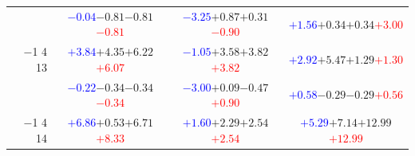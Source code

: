 \documentclass[compress]{beamer}
\begin{document}
\begin{frame}
\begin{tabular}{r | c | c | c}
          & \textcolor{blue}{$-0.04$}\hspace{0.1 cm}$-0.81$\hspace{0.1 cm}$-0.81$\hspace{0.1 cm}\textcolor{red}{$-0.81$} & \textcolor{blue}{$-3.25$}\hspace{0.1 cm}$+0.87$\hspace{0.1 cm}$+0.31$\hspace{0.1 cm}\textcolor{red}{$-0.90$} & \textcolor{blue}{$+1.56$}\hspace{0.1 cm}$+0.34$\hspace{0.1 cm}$+0.34$\hspace{0.1 cm}\textcolor{red}{$+3.00$} \\
$-$1 4 13 & \textcolor{blue}{$+3.84$}\hspace{0.1 cm}$+4.35$\hspace{0.1 cm}$+6.22$\hspace{0.1 cm}\textcolor{red}{$+6.07$} & \textcolor{blue}{$-1.05$}\hspace{0.1 cm}$+3.58$\hspace{0.1 cm}$+3.82$\hspace{0.1 cm}\textcolor{red}{$+3.82$} & \textcolor{blue}{$+2.92$}\hspace{0.1 cm}$+5.47$\hspace{0.1 cm}$+1.29$\hspace{0.1 cm}\textcolor{red}{$+1.30$} \\
          & \textcolor{blue}{$-0.22$}\hspace{0.1 cm}$-0.34$\hspace{0.1 cm}$-0.34$\hspace{0.1 cm}\textcolor{red}{$-0.34$} & \textcolor{blue}{$-3.00$}\hspace{0.1 cm}$+0.09$\hspace{0.1 cm}$-0.47$\hspace{0.1 cm}\textcolor{red}{$+0.90$} & \textcolor{blue}{$+0.58$}\hspace{0.1 cm}$-0.29$\hspace{0.1 cm}$-0.29$\hspace{0.1 cm}\textcolor{red}{$+0.56$} \\
$-$1 4 14 & \textcolor{blue}{$+6.86$}\hspace{0.1 cm}$+0.53$\hspace{0.1 cm}$+6.71$\hspace{0.1 cm}\textcolor{red}{$+8.33$} & \textcolor{blue}{$+1.60$}\hspace{0.1 cm}$+2.29$\hspace{0.1 cm}$+2.54$\hspace{0.1 cm}\textcolor{red}{$+2.54$} & \textcolor{blue}{$+5.29$}\hspace{0.1 cm}$+7.14$\hspace{0.1 cm}$+12.99$\hspace{0.1 cm}\textcolor{red}{$+12.99$} \\

\end{tabular}
\end{frame}
\end{document}
